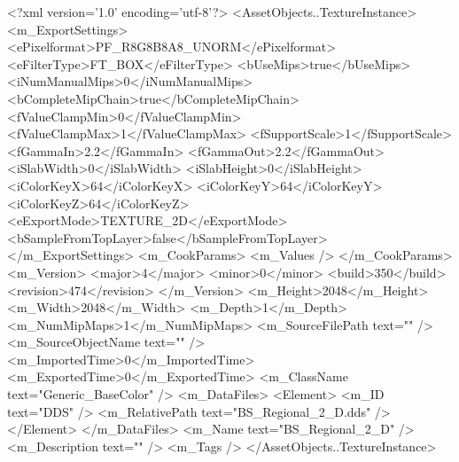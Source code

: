 <?xml version='1.0' encoding='utf-8'?>
<AssetObjects..TextureInstance>
  <m_ExportSettings>
    <ePixelformat>PF_R8G8B8A8_UNORM</ePixelformat>
    <eFilterType>FT_BOX</eFilterType>
    <bUseMips>true</bUseMips>
    <iNumManualMips>0</iNumManualMips>
    <bCompleteMipChain>true</bCompleteMipChain>
    <fValueClampMin>0</fValueClampMin>
    <fValueClampMax>1</fValueClampMax>
    <fSupportScale>1</fSupportScale>
    <fGammaIn>2.2</fGammaIn>
    <fGammaOut>2.2</fGammaOut>
    <iSlabWidth>0</iSlabWidth>
    <iSlabHeight>0</iSlabHeight>
    <iColorKeyX>64</iColorKeyX>
    <iColorKeyY>64</iColorKeyY>
    <iColorKeyZ>64</iColorKeyZ>
    <eExportMode>TEXTURE_2D</eExportMode>
    <bSampleFromTopLayer>false</bSampleFromTopLayer>
  </m_ExportSettings>
  <m_CookParams>
    <m_Values />
  </m_CookParams>
  <m_Version>
    <major>4</major>
    <minor>0</minor>
    <build>350</build>
    <revision>474</revision>
  </m_Version>
  <m_Height>2048</m_Height>
  <m_Width>2048</m_Width>
  <m_Depth>1</m_Depth>
  <m_NumMipMaps>1</m_NumMipMaps>
  <m_SourceFilePath text="" />
  <m_SourceObjectName text="" />
  <m_ImportedTime>0</m_ImportedTime>
  <m_ExportedTime>0</m_ExportedTime>
  <m_ClassName text="Generic_BaseColor" />
  <m_DataFiles>
    <Element>
      <m_ID text="DDS" />
      <m_RelativePath text="BS_Regional_2_D.dds" />
    </Element>
  </m_DataFiles>
  <m_Name text="BS_Regional_2_D" />
  <m_Description text="" />
  <m_Tags />
</AssetObjects..TextureInstance>